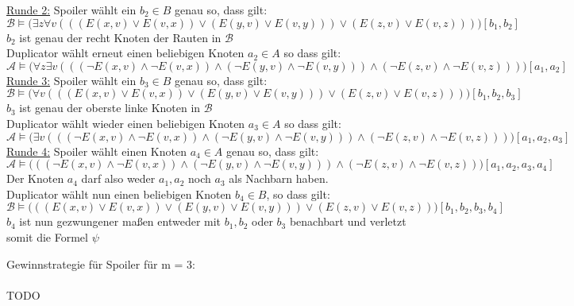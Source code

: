 \documentclass[a4paper,10pt]{article}
\begin{document}
\begin{compactenum} [(a)]
\begin{tabbing}
			\underline{Runde 2:} \> Spoiler wählt ein $ b_2 \in B $ genau so, dass gilt:\\
			\> $ \mathcal{B} \models \big(\exists z \forall v (((E(x,v)\vee E(v,x))\vee  (E(y,v)\vee E(v,y)))\vee (E(z,v)\vee E(v,z)))\big)[b_1,b_2] $ \\
			\> $ b_2 $ ist genau der recht Knoten der Rauten in $ \mathcal{B} $\\
			\> Duplicator wählt erneut einen beliebigen Knoten $ a_2 \in A$ so dass gilt:\\
			\> $ \mathcal{A} \models \big(\forall z \exists v (((\lnot E(x,v)\wedge \lnot E(v,x))\wedge  (\lnot E(y,v)\wedge \lnot E(v,y)))\wedge (\lnot E(z,v)\wedge \lnot E(v,z)))\big) [a_1,a_2] $ \\
			\underline{Runde 3:} \> Spoiler wählt ein $ b_3 \in B $ genau so, dass gilt:\\
			\> $ \mathcal{B} \models \big(\forall v (((E(x,v)\vee E(v,x))\vee  (E(y,v)\vee E(v,y)))\vee (E(z,v)\vee E(v,z)))\big)[b_1,b_2,b_3] $ \\
			\> $ b_3 $ ist genau der oberste linke Knoten in $ \mathcal{B} $\\
			\> Duplicator wählt wieder einen beliebigen Knoten $ a_3 \in A$ so dass gilt:\\
			\> $ \mathcal{A} \models \big(\exists v (((\lnot E(x,v)\wedge \lnot E(v,x))\wedge  (\lnot E(y,v)\wedge \lnot E(v,y)))\wedge (\lnot E(z,v)\wedge \lnot E(v,z)))\big) [a_1,a_2,a_3] $ \\
			\underline{Runde 4:} \> Spoiler wählt einen Knoten $ a_4 \in A$ genau so, dass gilt:\\
			\> $ \mathcal{A} \models \big(((\lnot E(x,v)\wedge \lnot E(v,x))\wedge  (\lnot E(y,v)\wedge \lnot E(v,y)))\wedge (\lnot E(z,v)\wedge \lnot E(v,z))\big) [a_1,a_2,a_3,a_4] $ \\
			\> Der Knoten $ a_4 $ darf also weder $ a_1, a_2 $ noch $ a_3 $ als Nachbarn haben.\\
			\> Duplicator wählt nun einen beliebigen Knoten $ b_4 \in B $, so dass gilt:\\
			\> $ \mathcal{B} \models \big(((E(x,v)\vee E(v,x))\vee  (E(y,v)\vee E(v,y)))\vee (E(z,v)\vee E(v,z))\big)[b_1,b_2,b_3,b_4] $ \\
			\> $ b_4 $ ist nun gezwungener maßen entweder mit $ b_1, b_2 $ oder $ b_3 $ benachbart und verletzt somit die Formel $ \psi $\\
		\end{tabbing}
		
		Gewinnstrategie für Spoiler für m = 3:\\
		\\
		TODO
		\\
		

\end{compactenum}
\end{document}
